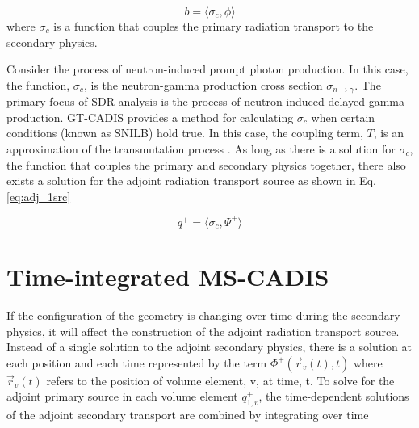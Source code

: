  \begin{equation}\label{eq:fwd_2src}
	 b =
	 \langle \sigma_c, \phi \rangle
 \end{equation}
where $\sigma_c$ is a function that couples the primary
radiation transport to the secondary physics.

Consider the process of neutron-induced prompt photon production.
In this case, the function, $\sigma_c$, is the neutron-gamma production
cross section $\sigma_{n\rightarrow\gamma}$.  The primary focus of SDR analysis
is the process of neutron-induced delayed gamma production. 
GT-CADIS provides a method for calculating $\sigma_c$ when
certain conditions (known as SNILB) hold true. In this case, the
coupling term, $T$, is an approximation of the transmutation
process \cite{gtcadis}.  As long as there is a solution for $\sigma_c$, the
function that couples the primary and secondary physics together,
there also exists a solution for the adjoint radiation transport source as shown in Eq.
\ref{eq:adj_1src}

 \begin{equation}\label{eq:adj_1src}
	 q^{+} = 
	 \langle \sigma_c, \Psi^{+} \rangle
 \end{equation}


\section{Time-integrated MS-CADIS}
If the configuration of the geometry is changing over time during
the secondary physics, it will affect the construction of the adjoint radiation
transport source.  Instead of a single solution to the adjoint secondary
physics, there is a solution at each position and each time represented by the term
	$ \Phi^{+}(\overrightarrow{r}_{v}(t), t)$
where $\overrightarrow{r}_{v}(t)$ refers to the position of volume element, v,
at time, t. 
To solve for the adjoint primary source in each volume element
$q_{1,v}^{+}$, the time-dependent solutions of the 
adjoint secondary transport are combined by integrating over time

